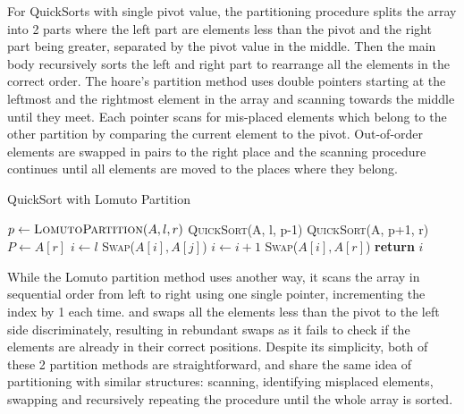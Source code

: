 \documentclass[a4paper,oneside,12pt]{book}
\begin{document}
For QuickSorts with single pivot value, the partitioning procedure splits the array into 2 parts where the left part are elements less than the pivot and the right part being greater, 
separated by the pivot value in the middle. Then the main body recursively sorts the left and right part to rearrange all the elements in the correct order. The hoare's partition method
uses double pointers starting at the leftmost and the rightmost element in the array and scanning towards the middle until they meet. Each pointer scans for mis-placed elements 
which belong to the other partition by comparing the current element to the pivot. 
Out-of-order elements are swapped in pairs to the right place and the scanning procedure continues until all elements 
are moved to the places where they belong.

\begin{algorithm}[H]
    \caption{QuickSort with Lomuto Partition}\label{LomutoPartition}
    \begin{algorithmic}[1]
        \State $p \gets \textsc{LomutoPartition}(A, l, r)$
        \State \textsc{QuickSort}(A, l, p-1)
        \State \textsc{QuickSort}(A, p+1, r)
        \EndIf
        \EndProcedure
        \State $P \gets A[r]$ 
        \State $i \gets l$
        \State \textsc{Swap}($A[i], A[j]$)
        \State $i \gets i + 1$
        \EndIf
        \EndFor
        \State \textsc{Swap}($A[i], A[r]$) 
        \State \textbf{return} $i$
        \EndProcedure
    \end{algorithmic}
\end{algorithm}

While the Lomuto partition method uses another way, it scans the array in sequential order from left to right using one single pointer, incrementing the index by 1 each time.
and swaps all the elements less than the pivot to the left side discriminately,
resulting in rebundant swaps as it fails to check if the elements are already in their correct positions. Despite its simplicity, both of these 2 partition methods are straightforward, 
and share the same idea of partitioning with similar structures: scanning, identifying misplaced elements, swapping and recursively repeating the procedure until the whole array is sorted.
\end{document}
